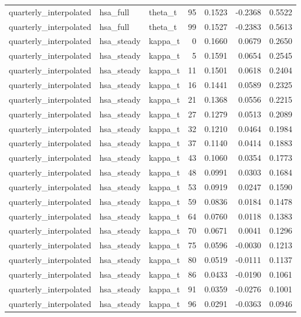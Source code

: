 \begin{tabular}{lllrrrr}
quarterly\_interpolated & hsa\_full & theta\_t & 95 & 0.1523 & -0.2368 & 0.5522 \\
quarterly\_interpolated & hsa\_full & theta\_t & 99 & 0.1527 & -0.2383 & 0.5613 \\
quarterly\_interpolated & hsa\_steady & kappa\_t & 0 & 0.1660 & 0.0679 & 0.2650 \\
quarterly\_interpolated & hsa\_steady & kappa\_t & 5 & 0.1591 & 0.0654 & 0.2545 \\
quarterly\_interpolated & hsa\_steady & kappa\_t & 11 & 0.1501 & 0.0618 & 0.2404 \\
quarterly\_interpolated & hsa\_steady & kappa\_t & 16 & 0.1441 & 0.0589 & 0.2325 \\
quarterly\_interpolated & hsa\_steady & kappa\_t & 21 & 0.1368 & 0.0556 & 0.2215 \\
quarterly\_interpolated & hsa\_steady & kappa\_t & 27 & 0.1279 & 0.0513 & 0.2089 \\
quarterly\_interpolated & hsa\_steady & kappa\_t & 32 & 0.1210 & 0.0464 & 0.1984 \\
quarterly\_interpolated & hsa\_steady & kappa\_t & 37 & 0.1140 & 0.0414 & 0.1883 \\
quarterly\_interpolated & hsa\_steady & kappa\_t & 43 & 0.1060 & 0.0354 & 0.1773 \\
quarterly\_interpolated & hsa\_steady & kappa\_t & 48 & 0.0991 & 0.0303 & 0.1684 \\
quarterly\_interpolated & hsa\_steady & kappa\_t & 53 & 0.0919 & 0.0247 & 0.1590 \\
quarterly\_interpolated & hsa\_steady & kappa\_t & 59 & 0.0836 & 0.0184 & 0.1478 \\
quarterly\_interpolated & hsa\_steady & kappa\_t & 64 & 0.0760 & 0.0118 & 0.1383 \\
quarterly\_interpolated & hsa\_steady & kappa\_t & 70 & 0.0671 & 0.0041 & 0.1296 \\
quarterly\_interpolated & hsa\_steady & kappa\_t & 75 & 0.0596 & -0.0030 & 0.1213 \\
quarterly\_interpolated & hsa\_steady & kappa\_t & 80 & 0.0519 & -0.0111 & 0.1137 \\
quarterly\_interpolated & hsa\_steady & kappa\_t & 86 & 0.0433 & -0.0190 & 0.1061 \\
quarterly\_interpolated & hsa\_steady & kappa\_t & 91 & 0.0359 & -0.0276 & 0.1001 \\
quarterly\_interpolated & hsa\_steady & kappa\_t & 96 & 0.0291 & -0.0363 & 0.0946 \\

\end{tabular}

